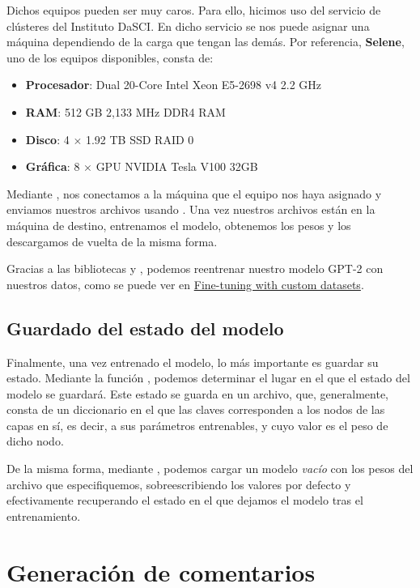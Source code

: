 Dichos equipos pueden ser muy caros. Para ello, hicimos uso del servicio de clústeres del Instituto DaSCI. En dicho servicio se nos puede asignar una máquina dependiendo de la carga que tengan las demás. Por referencia, \textbf{Selene}, uno de los equipos disponibles, consta de:
\begin{itemize}
	\item \textbf{Procesador}: Dual 20-Core Intel Xeon E5-2698 v4 2.2 GHz
	\item \textbf{RAM}: 512 GB 2,133 MHz DDR4 RAM
	\item \textbf{Disco}: 4 $\times$ 1.92 TB SSD RAID 0
	\item \textbf{Gráfica}: 8 $\times$ GPU NVIDIA Tesla V100 32GB 
\end{itemize}

Mediante , nos conectamos a la máquina que el equipo nos haya asignado y enviamos nuestros archivos usando . Una vez nuestros archivos están en la máquina de destino, entrenamos el modelo, obtenemos los pesos y los descargamos de vuelta de la misma forma.

Gracias a las bibliotecas \cite{pytorch} y \cite{WolfEtal2020Transformers}, podemos reentrenar nuestro modelo GPT-2 con nuestros datos, como se puede ver en \href{https://huggingface.co/transformers/custom_datasets.html}{Fine-tuning with custom datasets}. 

\subsection{Guardado del estado del modelo}
Finalmente, una vez entrenado el modelo, lo más importante es guardar su estado. Mediante la función , podemos determinar el lugar en el que el estado del modelo se guardará. Este estado se guarda en un archivo, que, generalmente, consta de un diccionario en el que las claves corresponden a los nodos de las capas en sí, es decir, a sus parámetros entrenables, y cuyo valor es el peso de dicho nodo. 

De la misma forma, mediante , podemos cargar un modelo \textit{vacío} con los pesos del archivo que especifiquemos, sobreescribiendo los valores por defecto y efectivamente recuperando el estado en el que dejamos el modelo tras el entrenamiento.



\section{Generación de comentarios}

